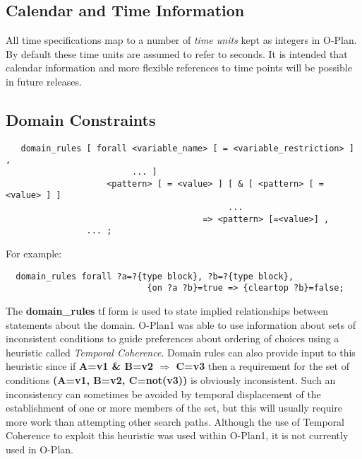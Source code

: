 \subsection{Calendar and Time Information}

All time specifications map to a number of {\em time units} kept
as integers in O-Plan.  By default these time units are assumed to refer to
seconds.  It is intended that calendar information and more flexible
references to time points will be possible in future releases.
 
\subsection{Domain Constraints}

\begin{verbatim}
   domain_rules [ forall <variable_name> [ = <variable_restriction> ] ,
                         ... ]
                    <pattern> [ = <value> ] [ & [ <pattern> [ = <value> ] ]
                                            ...
                                       => <pattern> [=<value>] ,
                ... ;
\end{verbatim}

For example:
\begin{verbatim}
  domain_rules forall ?a=?{type block}, ?b=?{type block},
                            {on ?a ?b}=true => {cleartop ?b}=false;
\end{verbatim}
\index{{\bf $\Rightarrow$}}

The {\bf domain\_rules} {\sc tf} form is used to state implied
relationships between statements about the domain. 
O-Plan1 was able to use information about sets of inconsistent conditions to
guide preferences about ordering of choices using a heuristic called {\em
Temporal Coherence}.  Domain rules can also provide input to this heuristic
since if {\bf A=v1 \& B=v2 $\Rightarrow$ C=v3} then a requirement for the set
of conditions {\bf (A=v1, B=v2, C=not(v3))} is obviously inconsistent.  Such
an inconsistency can sometimes be avoided by temporal displacement of the
establishment of one or more members of the set, but this will usually require
more work than attempting other search paths.  Although the use of Temporal
Coherence to exploit this heuristic was used within O-Plan1, it is not
currently used in O-Plan.

